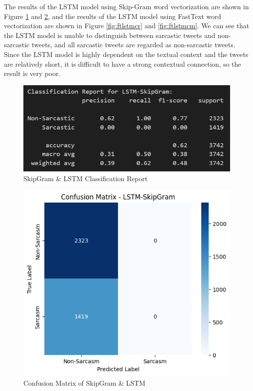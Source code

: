\documentclass[11pt]{article}
\begin{document}
The results of the LSTM model using Skip-Gram word vectorization are shown in Figure \ref{fig:sglstmcr} and \ref{fig:sglstmcm}, and the results of the LSTM model using FastText word vectorization are shown in Figure \ref{fig:ftlstmcr} and \ref{fig:ftlstmcm}. We can see that the LSTM model is unable to distinguish between sarcastic tweets and non-sarcastic tweets, and all sarcastic tweets are regarded as non-sarcastic tweets. Since the LSTM model is highly dependent on the textual context and the tweets are relatively short, it is difficult to have a strong contextual connection, so the result is very poor.
\begin{figure}[htbp]
    \centering
    \includegraphics[width=.8\linewidth]{pic/LSTM-Skipgram-Report.png}
    \caption{SkipGram \& LSTM Classification Report}
    \label{fig:sglstmcr}
\end{figure}
\begin{figure}[htbp]
    \centering
    \includegraphics[width=.8\linewidth]{pic/LSTM-Skipgram-Matrix.png}
    \caption{Confusion Matrix of SkipGram \& LSTM}
    \label{fig:sglstmcm}
\end{figure}
\end{document}
